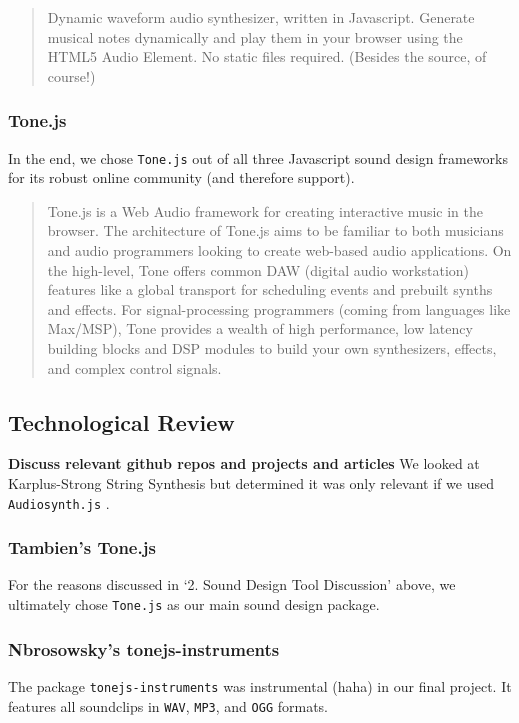 \documentclass[12pt,a4paper]{article}
\newcommand{\code}{\texttt}
\newcommand{\lightcode}[1]{\colorbox{light-gray}{\texttt{#1}}}
\begin{document}
\begin{quote}
Dynamic waveform audio synthesizer, written in Javascript. Generate musical notes dynamically and play them in your browser using the HTML5 Audio Element. No static files required. (Besides the source, of course!) \cite{audiosynth}
\end{quote}


\subsubsection{Tone.js}
In the end, we chose \lightcode{Tone.js} out of all three Javascript sound design frameworks for its robust online community (and therefore support).

\begin{quote}
Tone.js is a Web Audio framework for creating interactive music in the browser. The architecture of Tone.js aims to be familiar to both musicians and audio programmers looking to create web-based audio applications. On the high-level, Tone offers common DAW (digital audio workstation) features like a global transport for scheduling events and prebuilt synths and effects. For signal-processing programmers (coming from languages like Max/MSP), Tone provides a wealth of high performance, low latency building blocks and DSP modules to build your own synthesizers, effects, and complex control signals. \cite{tonejs}
\end{quote}

\subsection{Technological Review}
\textbf{Discuss relevant github repos and projects and articles}
We looked at Karplus-Strong String Synthesis but determined it was only relevant if we used \lightcode{Audiosynth.js} \cite{karplus-strong}.

\subsubsection{Tambien's Tone.js}
For the reasons discussed in `2. Sound Design Tool Discussion' above, we ultimately chose \lightcode{Tone.js} as our main sound design package.

\subsubsection{Nbrosowsky's tonejs-instruments}
The package \lightcode{tonejs-instruments} was instrumental (haha) in our final project. It features all soundclips in \code{WAV}, \code{MP3}, and \code{OGG} formats.
\end{document}
